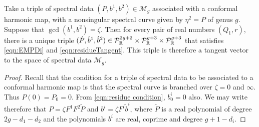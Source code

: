 \documentclass{article}
\begin{document}
\begin{lem}[Case (v)]
    \label{lem:tangent conformal}
Take a triple of spectral data $(P,b^1,b^2)\in\mathcal{M}_g$ associated with a conformal harmonic map, with a nonsingular spectral curve given by $\eta^2 = P$ of genus $g$. Suppose that $\gcd(b^1,b^2) = \zeta$. Then for every pair of real numbers $(Q_1,r)$, there is a unique triple $(\dot P, \dot b^1, \dot b^2) \in \mathcal{P}_{\mathbb{R}}^{2g+2}\times\mathcal{P}_{\mathbb{R}}^{g+3}\times\mathcal{P}_{\mathbb{R}}^{g+3}$ that satisfies \eqref{eqn:EMPDi} and \eqref{eqn:residueTangent}. This triple is therefore a tangent vector to the space of spectral data $\mathcal{M}_g$.

\begin{proof}
Recall that the condition for a triple of spectral data to be associated to a conformal harmonic map is that the spectral curve is branched over $\zeta=0$ and $\infty$. Thus $P(0) = P_0 =0$. From \eqref{eqn:residue condition}, $b^i_0 = 0$ also. We may write therefore that $P= \zeta F^1F^2\tilde{P}$ and $b^i = \zeta F^i \tilde{b}^i$, where $\tilde{P}$ is a real polynomial of degree $2g - d_1 - d_2$ and the polynomials $b^i$ are real, coprime and degree $g+1-d_i$.


\end{proof}
\end{lem}
\end{document}
